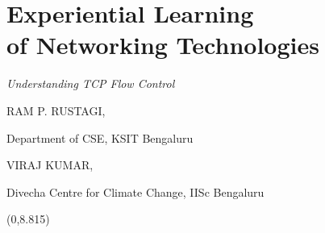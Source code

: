 \chapter{Experiential Learning\\ of Networking Technologies}
\vskip -15pt

\centerline{{\Huge\sl Understanding TCP Flow Control}}

\vskip 0.8cm

\begin{center}
{\large\uppercase{Ram P. Rustagi}}, 

\vskip -6pt

Department of CSE, KSIT Bengaluru 


\bigskip
{\large\uppercase{Viraj Kumar,}} 

\vskip -6pt

Divecha Centre for Climate Change, IISc Bengaluru

\end{center}

\begin{textblock}{16}(0,8.815)
\noindent{}
\end{textblock}
\newpage

